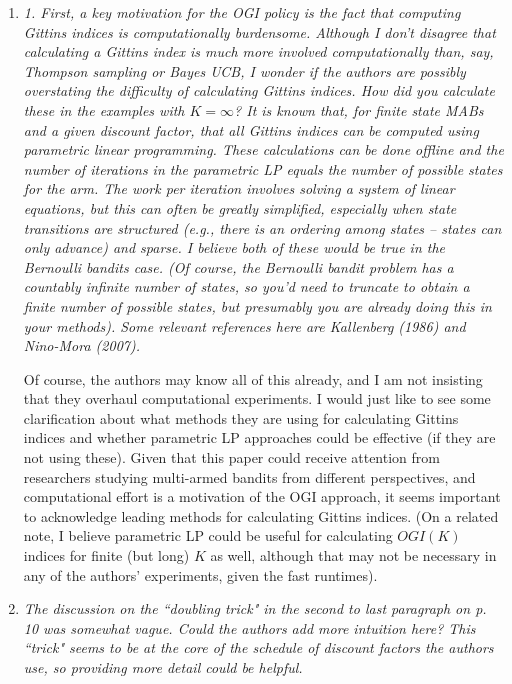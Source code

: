 \documentclass[11pt]{article}
\newcommand{\1}{\ensuremath{\mathbf{1}}} %
\theoremstyle{thm-sf}
\begin{document}
	\begin{enumerate}
		
		\item {\it 1. First, a key motivation for the OGI policy is the fact that computing Gittins indices is computationally burdensome. Although I don't disagree that calculating a Gittins index is much more involved computationally than, say, Thompson sampling or Bayes UCB, I wonder if the authors are possibly overstating the difficulty of calculating Gittins indices. How did you calculate these in the examples with $K=\infty$? It is known that, for finite state MABs and a given discount factor, that all Gittins indices can be computed using parametric linear programming. These calculations can be done offline and the number of iterations in the parametric LP equals the number of possible states for the arm. The work per iteration involves solving a system of linear equations, but this can often be greatly simplified, especially when state transitions are structured (e.g., there is an ordering among states – states can only advance) and sparse. I believe both of these would be true in the Bernoulli bandits case. (Of course, the Bernoulli bandit problem has a countably infinite number of states, so you'd need to truncate to obtain a finite number of possible states, but presumably you are already doing this in your methods). Some relevant references here are Kallenberg (1986) and Nino-Mora (2007).
			
		Of course, the authors may know all of this already, and I am not insisting that they overhaul computational experiments. I would just like to see some clarification about what methods they are using for calculating Gittins indices and whether parametric LP approaches could be effective (if they are not using these). Given that this paper could receive attention from researchers studying multi-armed bandits from different perspectives, and computational effort is a motivation of the OGI approach, it seems important to acknowledge leading methods for calculating Gittins indices. (On a related note, I believe parametric LP could be useful for calculating $OGI(K)$ indices for finite (but long) $K$ as well, although that may not be necessary in any of the authors’ experiments, given the fast runtimes).

		}
		
		\item {\it The discussion on the ``doubling trick" in the second to last paragraph on p. 10 was somewhat vague. Could the authors add more intuition here? This ``trick" seems to be at the core of the schedule of discount factors the authors use, so providing more detail could be helpful.}

	\end{enumerate}
	
\end{document}
